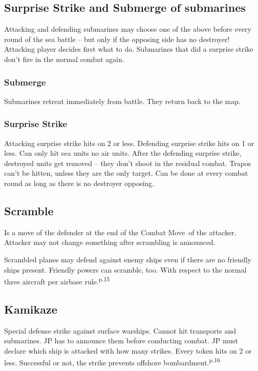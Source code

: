 \documentclass[10pt,twoside]{article}
\begin{document}
\begin{multicols*}{3}
\subsection*{Surprise Strike and Submerge of submarines}
Attacking and defending submarines may choose one of the above before every round of the sea battle -- but only if the opposing side has no destroyer! Attacking player decides first what to do. Submarines that did a surprise strike don't fire in the normal combat again.

\subsubsection*{Submerge}
Submarines retreat immediately from battle. They return back to the map.

\subsubsection*{Surprise Strike}
Attacking surprise strike hits on 2 or less. Defending surprise strike hits on 1 or less. Can only hit sea units no air units. After the defending surprise strike, destroyed units get removed -- they don't shoot in the residual combat. Trapos can't be hitten, unless they are the only target. Can be done at every combat round as long as there is no destroyer opposing.

\subsection*{Scramble}
Is a move of the defender at the end of the \glqq Combat Move\grqq\ of the attacker. Attacker may not change something after scrambling is announced.

Scrambled planes may defend against enemy ships even if there are no friendly ships present. Friendly powers can scramble, too. With respect to the normal three aircraft per airbase rule.\textsuperscript{p.15}

\subsection*{Kamikaze}
Special defense strike against surface warships. Cannot hit transports and submarines. JP has to announce them before conducting combat. JP must declare which ship is attacked with how many strikes. Every token hits on 2 or less. Successful or not, the strike prevents offshore bombardment.\textsuperscript{p.16}


\end{multicols*}
\end{document}
